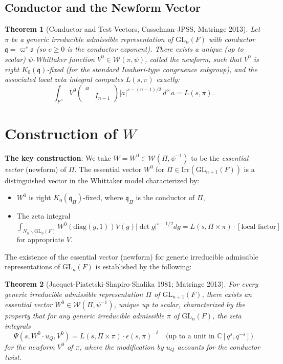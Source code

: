 \documentclass[12pt]{article}
\newtheorem{theorem}{Theorem}
\theoremstyle{definition}
\begin{document}
\subsection{Conductor and the Newform Vector}

\begin{theorem}[Conductor and Test Vectors, Casselman-JPSS, Matringe 2013]\label{thm:newform}
Let $\pi$ be a generic irreducible admissible representation of $\mathrm{GL}_n(F)$ with conductor $\mathfrak{q} = \varpi^c \mathfrak{o}$ (so $c \geq 0$ is the conductor exponent). There exists a unique (up to scalar) $\psi$-Whittaker function $V^0 \in \mathcal{W}(\pi,\psi)$, called the newform, such that $V^0$ is right $K_0(\mathfrak{q})$-fixed (for the standard Iwahori-type congruence subgroup), and the associated local zeta integral computes $L(s,\pi)$ exactly:
$$\int_{F^\times} V^0\!\begin{pmatrix} a & \\ & I_{n-1}\end{pmatrix} |a|^{s-(n-1)/2}\, d^\times a = L(s,\pi).$$
\end{theorem}

\section{Construction of $W$}

\textbf{The key construction}: We take $W = W^0 \in \mathcal{W}(\Pi,\psi^{-1})$ to be the \emph{essential vector} (newform) of $\Pi$. The essential vector $W^0$ for $\Pi \in \mathrm{Irr}(\mathrm{GL}_{n+1}(F))$ is a distinguished vector in the Whittaker model characterized by:
\begin{itemize}
\item $W^0$ is right $K_0(\mathfrak{q}_\Pi)$-fixed, where $\mathfrak{q}_\Pi$ is the conductor of $\Pi$,
\item The zeta integral $\int_{N_n\backslash\mathrm{GL}_n(F)} W^0(\mathrm{diag}(g,1))V(g)|\det g|^{s-1/2}dg = L(s,\Pi\times\pi)\cdot[\text{local factor}]$ for appropriate $V$.
\end{itemize}

The existence of the essential vector (newform) for generic irreducible admissible representations of $\mathrm{GL}_n(F)$ is established by the following:

\begin{theorem}[Jacquet-Piatetski-Shapiro-Shalika 1981; Matringe 2013]\label{thm:essential}
For every generic irreducible admissible representation $\Pi$ of $\mathrm{GL}_{n+1}(F)$, there exists an essential vector $W^0 \in \mathcal{W}(\Pi,\psi^{-1})$, unique up to scalar, characterized by the property that for any generic irreducible admissible $\pi$ of $\mathrm{GL}_n(F)$, the zeta integrals
$$\Psi(s, W^0\cdot u_Q, V^0) = L(s,\Pi\times\pi) \cdot \epsilon(s, \pi)^{-\delta} \quad \text{(up to a unit in } \mathbb{C}[q^s,q^{-s}])$$
for the newform $V^0$ of $\pi$, where the modification by $u_Q$ accounts for the conductor twist.
\end{theorem}
\end{document}
